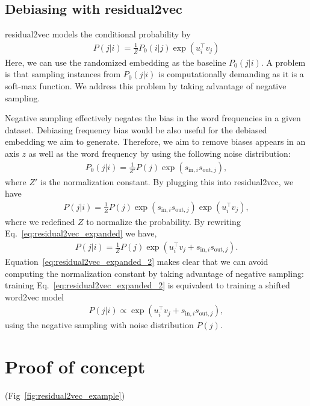 \documentclass[12pt]{article} %
\begin{document}
\subsection{Debiasing with residual2vec}

residual2vec models the conditional probability by
\begin{align}
P(j\vert i) = \frac{1}{Z}P_0(i \vert j)\exp(u_i ^\top v_j) \label{eq:residual2vec}
\end{align}
Here, we can use the randomized embedding as the baseline $P_0(j\vert i)$. A problem is that sampling instances from $P_0(j\vert i)$ is computationally demanding as it is a soft-max function. We address this problem by taking advantage of negative sampling.

Negative sampling effectively negates the bias in the word frequencies in a given dataset. Debiasing frequency bias would be also useful for the debiased embedding we aim to generate. Therefore, we aim to remove biases appears in an axis $z$ as well as the word frequency by using the following noise distribution:
\begin{align}
P_0(j \vert i) = \frac{1}{Z'}P(j)\exp(s_{\text{in},i}s_{\text{out}, j}),
\end{align}
where $Z'$ is the normalization constant. By plugging this into residual2vec, we have
\begin{align}
P(j\vert i) = \frac{1}{Z}P(j)\exp(s_{\text{in},i}s_{\text{out}, j})\exp(u_i ^\top v_j), \label{eq:residual2vec_expanded}
\end{align}
where we redefined $Z$ to normalize the probability. By rewriting Eq.~\eqref{eq:residual2vec_expanded} we have,
\begin{align}
P(j\vert i) = \frac{1}{Z}P(j)\exp(u_i ^\top v_j + s_{\text{in},i}s_{\text{out}, j}). \label{eq:residual2vec_expanded_2}
\end{align}
Equation~\eqref{eq:residual2vec_expanded_2} makes clear that we can avoid computing the normalization constant by taking advantage of negative sampling: training Eq.~\eqref{eq:residual2vec_expanded_2} is equivalent to training a shifted word2vec model
\begin{align}
P(j\vert i) \propto \exp(u_i ^\top v_j + s_{\text{in},i}s_{\text{out}, j}),
\end{align}
using the negative sampling with noise distribution $P(j)$.

\section{Proof of concept}
(Fig~\ref{fig:residual2vec_example})
\end{document}
